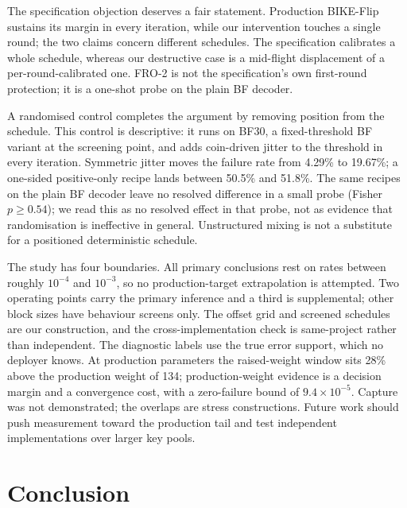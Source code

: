 \documentclass[letterpaper,journal]{IEEEtran}
\begin{document}
The specification objection deserves a fair statement. Production BIKE-Flip sustains its margin in every iteration, while our intervention touches a single round; the two claims concern different schedules. The specification calibrates a whole schedule, whereas our destructive case is a mid-flight displacement of a per-round-calibrated one. FRO-2 is not the specification's own first-round protection; it is a one-shot probe on the plain BF decoder.

A randomised control completes the argument by removing position from the schedule. This control is descriptive: it runs on BF30, a fixed-threshold BF variant at the screening point, and adds coin-driven jitter to the threshold in every iteration. Symmetric jitter moves the failure rate from 4.29\% to 19.67\%; a one-sided positive-only recipe lands between 50.5\% and 51.8\%. The same recipes on the plain BF decoder leave no resolved difference in a small probe (Fisher $p\ge0.54$); we read this as no resolved effect in that probe, not as evidence that randomisation is ineffective in general. Unstructured mixing is not a substitute for a positioned deterministic schedule.

The study has four boundaries. All primary conclusions rest on rates between roughly $10^{-4}$ and $10^{-3}$, so no production-target extrapolation is attempted. Two operating points carry the primary inference and a third is supplemental; other block sizes have behaviour screens only. The offset grid and screened schedules are our construction, and the cross-implementation check is same-project rather than independent. The diagnostic labels use the true error support, which no deployer knows. At production parameters the raised-weight window sits 28\% above the production weight of 134; production-weight evidence is a decision margin and a convergence cost, with a zero-failure bound of $9.4\times10^{-5}$. Capture was not demonstrated; the overlaps are stress constructions. Future work should push measurement toward the production tail and test independent implementations over larger key pools.

\section{Conclusion}\label{sec:conclusion}
\end{document}

